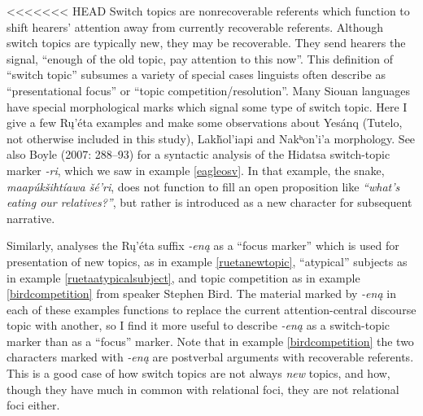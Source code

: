 \documentclass[output=paper]{LSP/langsci}
\begin{document}
<<<<<<< HEAD
	Switch topics are nonrecoverable referents which function to shift hearers’ attention away from currently recoverable referents. Although switch topics are typically new, they may be recoverable. They send hearers the signal, “enough of the old topic, pay attention to this now”. This definition of “switch topic” subsumes a variety of special cases linguists often describe as “presentational focus” or “topic competition/resolution”. Many Siouan languages have special morphological marks which signal some type of switch topic. Here I give a few Rų’éta examples and make some observations about Yesánq (Tutelo, not otherwise included in this study), Lakȟol’iapi and Nakʰon’i’a morphology. See also Boyle (2007: 288--93) for a syntactic analysis of the Hidatsa switch-topic marker \emph{-ri}, which we saw in example \ref{eagleosv}. In that example, the snake, \emph{maapúkšihtíawa šé’ri}, does not function to fill an open proposition like \emph{“what’s eating our relatives?”}, but rather is introduced as a new character for subsequent narrative.
	
	Similarly, \citet{Wolvengrey1990} analyses the Rų’éta suffix \emph{-eną} as a “focus marker” which is used for presentation of new topics, as in example \ref{ruetanewtopic}, “atypical” subjects as in example \ref{ruetaatypicalsubject}, and topic competition as in example \ref{birdcompetition} from speaker Stephen Bird. The material marked by \emph{-eną} in each of these examples functions to replace the current attention-central discourse topic with another, so I find it more useful to describe \emph{-eną} as a switch-topic marker than as a “focus” marker. Note that in example \ref{birdcompetition} the two characters marked with \emph{-eną} are postverbal arguments with recoverable referents. This is a good case of how switch topics are not always \emph{new} topics, and how, though they have much in common with relational foci, they are not relational foci either.
\end{document}

